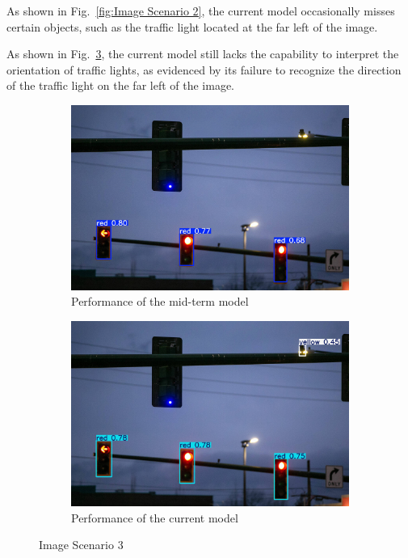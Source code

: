 \documentclass[journal,transmag]{IEEEtran}
\begin{document}
As shown in Fig.~\ref{fig:Image Scenario 2}, the current model occasionally misses certain objects, such as the traffic light located at the far left of the image.

As shown in Fig.~\ref{fig:Image Scenario 4}, the current model still lacks the capability to interpret the orientation of traffic lights, as evidenced by its failure to recognize the direction of the traffic light on the far left of the image.

\begin{figure}[h]
    \centering
    \begin{subfigure}[b]{0.225\textwidth}
        \includegraphics[width=\textwidth]{Result_4.png}
        \caption{Performance of the mid-term model}
        \label{fig:Result_4}
    \end{subfigure}
    \hfill
    \begin{subfigure}[b]{0.225\textwidth}
        \includegraphics[width=\textwidth]{Result_4_new.jpg}
        \caption{Performance of the current model
}
        \label{fig:Result_4_new}
    \end{subfigure}
    \caption{Image Scenario 3}
    \label{fig:Image Scenario 4}
\end{figure}
\end{document}
